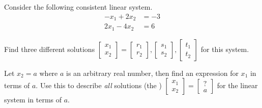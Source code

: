 \begin{applicationActivities}{1}{3}
\begin{activity}{10}
  Consider the following consistent linear system.
  \begin{align*}
  -x_1+2x_2  &= -3 \\
  2x_1-4x_2  &=  6
  \end{align*}
\begin{subactivity}
  Find three different solutions
  \(
    \begin{bmatrix}
      x_1 \\
      x_2
    \end{bmatrix}=
    \begin{bmatrix}
      r_1 \\
      r_2
    \end{bmatrix},
    \begin{bmatrix}
      s_1 \\
      s_2
    \end{bmatrix},
    \begin{bmatrix}
      t_1 \\
      t_2
    \end{bmatrix}
  \)
  for this system.
\end{subactivity}
\begin{subactivity}
  Let \(x_2=a\) where \(a\) is an arbitrary real number, then find an
  expression for \(x_1\) in terms of \(a\). Use this to describe \textit{all}
  solutions (the )
  \(
    \begin{bmatrix}
      x_1 \\
      x_2
    \end{bmatrix}=
    \begin{bmatrix}
      ? \\
      a
    \end{bmatrix}
  \)
  for the linear system in terms of \(a\).
\end{subactivity}
\end{activity}



\end{applicationActivities}
